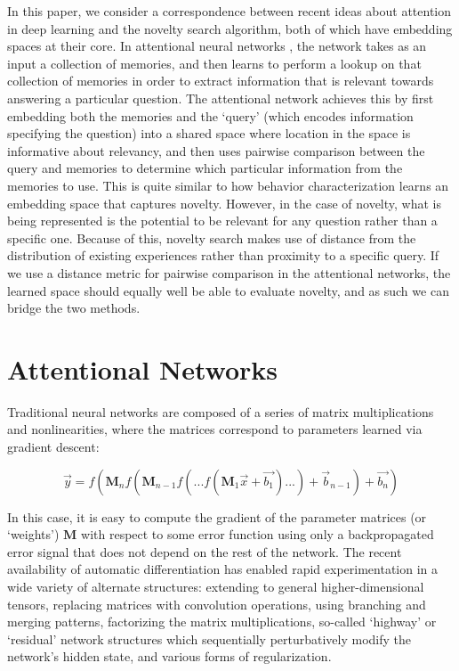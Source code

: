 \documentclass[letterpaper]{article}
\begin{document}
In this paper, we consider a correspondence between recent ideas about attention in deep learning and the novelty search algorithm, both of which have embedding spaces at their core. In attentional neural networks \citep{vaswani2017attention}, the network takes as an input a collection of memories, and then learns to perform a lookup on that collection of memories in order to extract information that is relevant towards answering a particular question. The attentional network achieves this by first embedding both the memories and the `query' (which encodes information specifying the question) into a shared space where location in the space is informative about relevancy, and then uses pairwise comparison between the query and memories to determine which particular information from the memories to use. This is quite similar to how behavior characterization learns an embedding space that captures novelty. However, in the case of novelty, what is being represented is the potential to be relevant for any question rather than a specific one. Because of this, novelty search makes use of distance from the distribution of existing experiences rather than proximity to a specific query. If we use a distance metric for pairwise comparison in the attentional networks, the learned space should equally well be able to evaluate novelty, and as such we can bridge the two methods.


\section{Attentional Networks}

Traditional neural networks are composed of a series of matrix multiplications and nonlinearities, where the matrices correspond to parameters learned via gradient descent:

\begin{equation}
 \vec{y} = f( \textbf{M}_n f( \textbf{M}_{n-1} f( ... f( \textbf{M}_1 \vec{x} + \vec{b_1} ) ... ) + \vec{b}_{n-1} ) + \vec{b_n} )
\end{equation}

In this case, it is easy to compute the gradient of the parameter matrices (or `weights') $\textbf{M}$ with respect to some error function using only a backpropagated error signal that does not depend on the rest of the network. The recent availability of automatic differentiation has enabled rapid experimentation in a wide variety of alternate structures: extending to general higher-dimensional tensors, replacing matrices with convolution operations, using branching and merging patterns, factorizing the matrix multiplications, so-called `highway' or `residual' network structures which sequentially perturbatively modify the network's hidden state, and various forms of regularization.
\end{document}

